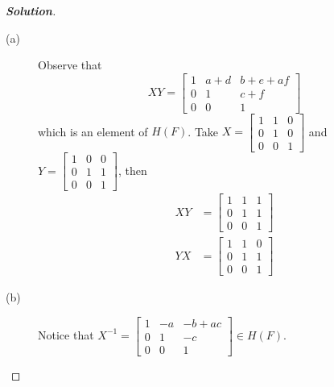 \documentclass[12pt,leqno]{book}
\theoremstyle{definition}
\newenvironment{Solution}{\begin{proof}[\textnormal{\textbf{Solution}}]}{\end{proof}}
\begin{document}
\begin{description}
\begin{Solution}
\begin{description}
    \item [(a)] Observe that \[XY=\begin{bmatrix}1&a+d&b+e+af\\0&1&c+f\\0&0&1\end{bmatrix}\] which is an element of $H(F)$. Take $X=\begin{bmatrix}1&1&0\\0&1&0\\0&0&1\end{bmatrix}$ and $Y=\begin{bmatrix}1&0&0\\0&1&1\\0&0&1\end{bmatrix}$, then \begin{align*}XY&=\begin{bmatrix}1&1&1\\0&1&1\\0&0&1\end{bmatrix}\\YX&=\begin{bmatrix}1&1&0\\0&1&1\\0&0&1\end{bmatrix}\end{align*}
    \item [(b)] Notice that $X^{-1}=\begin{bmatrix}1&-a&-b+ac\\0&1&-c\\0&0&1\end{bmatrix}\in H(F)$.

\end{description}
\end{Solution}
\end{description}
\end{document}
